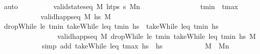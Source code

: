 \begin{isabellebody}
\ auto\isanewline
\ \ \ \ \ \ \isamarkupfalse%
\ \isamarkupfalse%
\ {\isachardoublequoteopen}valid{\isacharunderscore}{\kern0pt}state{\isacharunderscore}{\kern0pt}seq\ M\ htps\ {\isasympi}s\ M\isactrlsub n{\isachardoublequoteclose}\isanewline
\ \ \ \ \ \ \isamarkupfalse%
\isanewline
\ \ \ \ \ \ \ \ \isamarkupfalse%
\ {\isachardoublequoteopen}t\isactrlsub m\isactrlsub i\isactrlsub n\ {\isacharequal}{\kern0pt}\ t\isactrlsub m\isactrlsub a\isactrlsub x{\isachardoublequoteclose}\isanewline
\ \ \ \ \ \ \ \ \isamarkupfalse%
\ \isamarkupfalse%
\ {\isachardoublequoteopen}valid{\isacharunderscore}{\kern0pt}happ{\isacharunderscore}{\kern0pt}seq\ M\ hs\ M\isanewline
\ \ \ \ \ \ \ \ \ \ \isamarkupfalse%
\ {\isacartoucheopen}dropWhile\ {\isacharparenleft}{\kern0pt}le\ t\isactrlsub m\isactrlsub i\isactrlsub n{\isacharparenright}{\kern0pt}\ {\isacharparenleft}{\kern0pt}takeWhile\ {\isacharparenleft}{\kern0pt}leq\ t\isactrlsub m\isactrlsub i\isactrlsub n{\isacharparenright}{\kern0pt}\ hs{\isacharparenright}{\kern0pt}\ {\isacharequal}{\kern0pt}\ takeWhile\ {\isacharparenleft}{\kern0pt}leq\ t\isactrlsub m\isactrlsub i\isactrlsub n{\isacharparenright}{\kern0pt}\ hs{\isacartoucheclose}\ \isanewline
\ \ \ \ \ \ \ \ \ \ \ \ \ \ \ \ {\isacartoucheopen}valid{\isacharunderscore}{\kern0pt}happ{\isacharunderscore}{\kern0pt}seq\ M\ {\isacharparenleft}{\kern0pt}dropWhile\ {\isacharparenleft}{\kern0pt}le\ t\isactrlsub m\isactrlsub i\isactrlsub n{\isacharparenright}{\kern0pt}\ {\isacharparenleft}{\kern0pt}takeWhile\ {\isacharparenleft}{\kern0pt}leq\ t\isactrlsub m\isactrlsub i\isactrlsub n{\isacharparenright}{\kern0pt}\ hs{\isacharparenright}{\kern0pt}{\isacharparenright}{\kern0pt}\ M\isanewline
\ \ \ \ \ \ \ \ \ \ \isamarkupfalse%
\ {\isacharparenleft}{\kern0pt}simp\ add{\isacharcolon}{\kern0pt}\ {\isacartoucheopen}takeWhile\ {\isacharparenleft}{\kern0pt}leq\ t\isactrlsub m\isactrlsub a\isactrlsub x{\isacharparenright}{\kern0pt}\ hs\ {\isacharequal}{\kern0pt}\ hs{\isacartoucheclose}{\isacharparenright}{\kern0pt}\isanewline
\ \ \ \ \ \ \ \ \isamarkupfalse%
\ \isamarkupfalse%
\ {\isachardoublequoteopen}M\ {\isacharequal}{\kern0pt}\ M\isactrlsub n{\isachardoublequoteclose}\isanewline
\ \ \ \ \ \ \ \ \ \ \isamarkupfalse%

\end{isabellebody}
